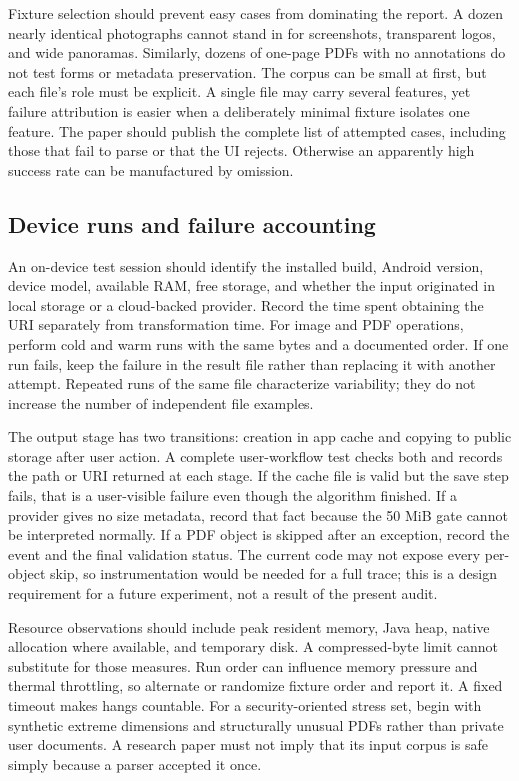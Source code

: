 \documentclass[10pt,letterpaper]{article}
\begin{document}
Fixture selection should prevent easy cases from dominating the report. A dozen nearly identical photographs cannot stand in for screenshots, transparent logos, and wide panoramas. Similarly, dozens of one-page PDFs with no annotations do not test forms or metadata preservation. The corpus can be small at first, but each file's role must be explicit. A single file may carry several features, yet failure attribution is easier when a deliberately minimal fixture isolates one feature. The paper should publish the complete list of attempted cases, including those that fail to parse or that the UI rejects. Otherwise an apparently high success rate can be manufactured by omission.

\subsection{Device runs and failure accounting}

An on-device test session should identify the installed build, Android version, device model, available RAM, free storage, and whether the input originated in local storage or a cloud-backed provider. Record the time spent obtaining the URI separately from transformation time. For image and PDF operations, perform cold and warm runs with the same bytes and a documented order. If one run fails, keep the failure in the result file rather than replacing it with another attempt. Repeated runs of the same file characterize variability; they do not increase the number of independent file examples.

The output stage has two transitions: creation in app cache and copying to public storage after user action. A complete user-workflow test checks both and records the path or URI returned at each stage. If the cache file is valid but the save step fails, that is a user-visible failure even though the algorithm finished. If a provider gives no size metadata, record that fact because the 50 MiB gate cannot be interpreted normally. If a PDF object is skipped after an exception, record the event and the final validation status. The current code may not expose every per-object skip, so instrumentation would be needed for a full trace; this is a design requirement for a future experiment, not a result of the present audit.

Resource observations should include peak resident memory, Java heap, native allocation where available, and temporary disk. A compressed-byte limit cannot substitute for those measures. Run order can influence memory pressure and thermal throttling, so alternate or randomize fixture order and report it. A fixed timeout makes hangs countable. For a security-oriented stress set, begin with synthetic extreme dimensions and structurally unusual PDFs rather than private user documents. A research paper must not imply that its input corpus is safe simply because a parser accepted it once.
\end{document}
